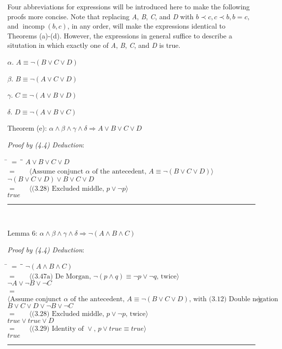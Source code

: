 \documentclass[12pt, fleqn, leqno]{article}
\newcommand{\lgap}{2pt}                             %
\newcommand{\mymathindent}{24pt}                    %
\newcommand{\impl}{\ensuremath{\Rightarrow}}        %
\newcommand{\myqed}{\rule[-.23ex]{1.2ex}{2.0ex}}
\newcommand{\myqedtab}{\hspace{384pt}}              %
\newcommand{\Gll} {\langle}                         %
\newcommand{\Ggg} {\rangle}                         %
\newcommand{\Hint}[1]     {\ \ \ $\Gll              \mbox{#1} \Ggg$ }   %
\DeclareMathOperator{\incomp}{incomp}
\begin{document}
Four abbreviations for expressions will be introduced here to make the following proofs more concise. Note that replacing \textit{A}, \textit{B}, \textit{C}, and \textit{D} with $b \prec c, c \prec b, b = c,$ and $\incomp(b,c)$, in any order, will make the expressions identical to Theorems (a)-(d). However, the expressions in general suffice to describe a situtation in which exactly one of \textit{A}, \textit{B}, \textit{C}, and \textit{D} is true.

$\alpha$. $A \equiv \lnot (B \lor C \lor D)$

$\beta$.  $B \equiv \lnot (A \lor C \lor D)$

$\gamma$. $C \equiv \lnot (A \lor B \lor D)$

$\delta$. $D \equiv \lnot (A \lor B \lor C)$


Theorem (e): $\alpha \land \beta \land \gamma \land \delta \impl A \lor B \lor C \lor D$

\textit{Proof by (4.4) Deduction}:
\begin{tabbing}
\hspace{\mymathindent} \= $= \;$ \= \myqedtab \= \kill
	\> \>  $A \lor B \lor C \lor D$\\
	\> $=$  \>  \Hint{Assume conjunct $\alpha$ of the antecedent, $A \equiv \lnot (B \lor C \lor D)$}\\[\lgap]
	\> \>   $ \lnot (B \lor C \lor D) \lor B \lor C \lor D$\\
	\> $=$  \>  \Hint{(3.28) Excluded middle, $p \lor  \lnot p$}\\[\lgap]
	\> \>   $true$ \quad \myqed\\
\end{tabbing}

Lemma 6: $\alpha \land \beta \land \gamma \land \delta \impl \lnot (A \land B \land C)$

\textit{Proof by (4.4) Deduction}:
\begin{tabbing}
\hspace{\mymathindent} \= $= \;$ \= \myqedtab \= \kill
	\> \>  $\lnot (A \land B \land C)$\\
	\> $=$  \>  \Hint{(3.47a) De Morgan, $\lnot (p \land q) \equiv \lnot p \lor \lnot q$, twice}\\[\lgap]
	\> \>   $\lnot A \lor \lnot B \lor \lnot C$\\
	\> $=$  \>  \Hint{Assume conjunct $\alpha$ of the antecedent, $A \equiv \lnot (B \lor C \lor D)$, with (3.12) Double negation}\\[\lgap]
	\> \>   $B \lor C \lor D \lor \lnot B \lor \lnot C$\\
	\> $=$  \>  \Hint{(3.28) Excluded middle, $p \lor \lnot p$, twice}\\[\lgap]
	\> \>   $true \lor true \lor D$\\
	\> $=$  \>  \Hint{(3.29) Identity of $\lor$, $p \lor true \equiv true$}\\[\lgap]
	\> \>   $true$ \quad \myqed\\
\end{tabbing}
\end{document}
